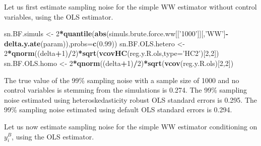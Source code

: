 \documentclass[]{book}
\newenvironment{Shaded}{\begin{snugshade}}{\end{snugshade}}
\newcommand{\DataTypeTok}[1]{\textcolor[rgb]{0.13,0.29,0.53}{#1}}
\newcommand{\DecValTok}[1]{\textcolor[rgb]{0.00,0.00,0.81}{#1}}
\newcommand{\FloatTok}[1]{\textcolor[rgb]{0.00,0.00,0.81}{#1}}
\newcommand{\KeywordTok}[1]{\textcolor[rgb]{0.13,0.29,0.53}{\textbf{#1}}}
\newcommand{\NormalTok}[1]{#1}
\newcommand{\OperatorTok}[1]{\textcolor[rgb]{0.81,0.36,0.00}{\textbf{#1}}}
\newcommand{\StringTok}[1]{\textcolor[rgb]{0.31,0.60,0.02}{#1}}
\theoremstyle{definition}
\theoremstyle{definition}
\theoremstyle{definition}
\theoremstyle{remark}
\let\BeginKnitrBlock\begin \let\EndKnitrBlock\end
\begin{document}
\BeginKnitrBlock{example}
\protect\hypertarget{exm:unnamed-chunk-77}{}{\label{exm:unnamed-chunk-77} }Let us first estimate sampling noise for the simple WW estimator without control variables, using the OLS estimator.
\EndKnitrBlock{example}

\begin{Shaded}
\begin{Highlighting}[]
\NormalTok{sn.BF.simuls <-}\StringTok{ }\DecValTok{2}\OperatorTok{*}\KeywordTok{quantile}\NormalTok{(}\KeywordTok{abs}\NormalTok{(simuls.brute.force.ww[[}\StringTok{'1000'}\NormalTok{]][,}\StringTok{'WW'}\NormalTok{]}\OperatorTok{-}\KeywordTok{delta.y.ate}\NormalTok{(param)),}\DataTypeTok{probs=}\KeywordTok{c}\NormalTok{(}\FloatTok{0.99}\NormalTok{))}
\NormalTok{sn.BF.OLS.hetero <-}\StringTok{ }\DecValTok{2}\OperatorTok{*}\KeywordTok{qnorm}\NormalTok{((delta}\OperatorTok{+}\DecValTok{1}\NormalTok{)}\OperatorTok{/}\DecValTok{2}\NormalTok{)}\OperatorTok{*}\KeywordTok{sqrt}\NormalTok{(}\KeywordTok{vcovHC}\NormalTok{(reg.y.R.ols,}\DataTypeTok{type=}\StringTok{'HC2'}\NormalTok{)[}\DecValTok{2}\NormalTok{,}\DecValTok{2}\NormalTok{])}
\NormalTok{sn.BF.OLS.homo <-}\StringTok{ }\DecValTok{2}\OperatorTok{*}\KeywordTok{qnorm}\NormalTok{((delta}\OperatorTok{+}\DecValTok{1}\NormalTok{)}\OperatorTok{/}\DecValTok{2}\NormalTok{)}\OperatorTok{*}\KeywordTok{sqrt}\NormalTok{(}\KeywordTok{vcov}\NormalTok{(reg.y.R.ols)[}\DecValTok{2}\NormalTok{,}\DecValTok{2}\NormalTok{])}
\end{Highlighting}
\end{Shaded}

The true value of the 99\% sampling noise with a sample size of 1000 and no control variables is stemming from the simulations is 0.274.
The 99\% sampling noise estimated using heteroskedasticity robust OLS standard errors is 0.295.
The 99\% sampling noise estimated using default OLS standard errors is 0.294.

Let us now estimate sampling noise for the simple WW estimator conditioning on \(y_i^B\), using the OLS estimator.
\end{document}
